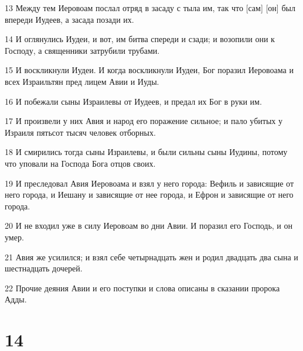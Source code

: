 \par 13 Между тем Иеровоам послал отряд в засаду с тыла им, так что [сам] [он] был впереди Иудеев, а засада позади их.
\par 14 И оглянулись Иудеи, и вот, им битва спереди и сзади; и возопили они к Господу, а священники затрубили трубами.
\par 15 И воскликнули Иудеи. И когда воскликнули Иудеи, Бог поразил Иеровоама и всех Израильтян пред лицем Авии и Иуды.
\par 16 И побежали сыны Израилевы от Иудеев, и предал их Бог в руки им.
\par 17 И произвели у них Авия и народ его поражение сильное; и пало убитых у Израиля пятьсот тысяч человек отборных.
\par 18 И смирились тогда сыны Израилевы, и были сильны сыны Иудины, потому что уповали на Господа Бога отцов своих.
\par 19 И преследовал Авия Иеровоама и взял у него города: Вефиль и зависящие от него города, и Иешану и зависящие от нее города, и Ефрон и зависящие от него города.
\par 20 И не входил уже в силу Иеровоам во дни Авии. И поразил его Господь, и он умер.
\par 21 Авия же усилился; и взял себе четырнадцать жен и родил двадцать два сына и шестнадцать дочерей.
\par 22 Прочие деяния Авии и его поступки и слова описаны в сказании пророка Адды.

\chapter{14}

